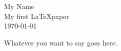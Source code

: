 \documentclass[12pt,letterpaper]{article}
\begin{document}
\linespread{1} %
\small \normalsize %
\begin{flushright}
My Name \\
My first \LaTeX paper \\
\today
\end{flushright}

Whatever you want to say goes here.
\end{document}
